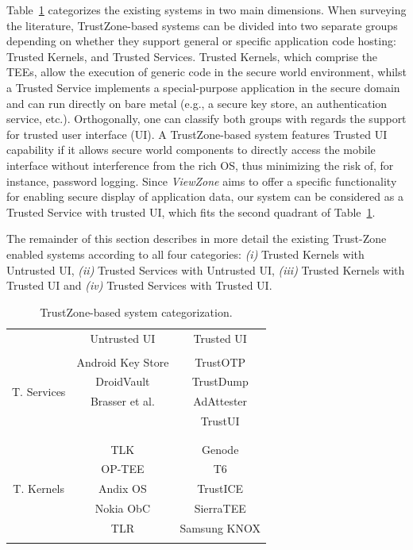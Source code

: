 Table~\ref{tab:trustzonesystemscomparison} categorizes the existing systems in two main dimensions. When surveying the literature, TrustZone-based systems can be divided into two separate groups depending on whether they support general or specific application code hosting: Trusted Kernels, and Trusted Services. Trusted Kernels, which comprise the TEEs, allow the execution of generic code in the secure world environment, whilst a Trusted Service implements a special-purpose application in the secure domain and can run directly on bare metal (e.g., a secure key store, an authentication service, etc.). Orthogonally, one can classify both groups with regards the support for trusted user interface (UI). A TrustZone-based system features Trusted UI capability if it allows secure world components to directly access the mobile interface without interference from the rich OS, thus minimizing the risk of, for instance, password logging. Since \emph{ViewZone} aims to offer a specific functionality for enabling secure display of application data, our system can be considered as a Trusted Service with trusted UI, which fits the second quadrant of Table~\ref{tab:trustzonesystemscomparison}.

The remainder of this section describes in more detail the existing Trust-Zone enabled systems according to all four categories: \emph{(i)} Trusted Kernels with Untrusted UI, \emph{(ii)} Trusted Services with Untrusted UI, \emph{(iii)} Trusted Kernels with Trusted UI and \emph{(iv)} Trusted Services with Trusted UI.
\begin{table}[t!]
	\caption{TrustZone-based system categorization.}
	\label{tab:trustzonesystemscomparison}
	\centering
	\begin{tabular}{ c|c|c| }
		\multicolumn{1}{c}{} 				& \multicolumn{1}{c}{Untrusted UI} 	& \multicolumn{1}{c}{Trusted UI} \\ \cline{2-3}
		\multirow{6}{*}{T. Services} 	&									& \\
		& Android Key Store					& TrustOTP \\
		& DroidVault 						& TrustDump \\
		& Brasser et al.					& AdAttester \\
		& 									& TrustUI \\
		&									& \\
		\cline{2-3}
		\multirow{7}{*}{T. Kernels}	&									& \\
		& TLK								& Genode \\
		& OP-TEE 							& T6 \\
		& Andix OS							& TrustICE \\
		& Nokia ObC							& SierraTEE \\
		& TLR 								& Samsung KNOX \\
		&									& \\
		\cline{2-3}
	\end{tabular}
\end{table}

